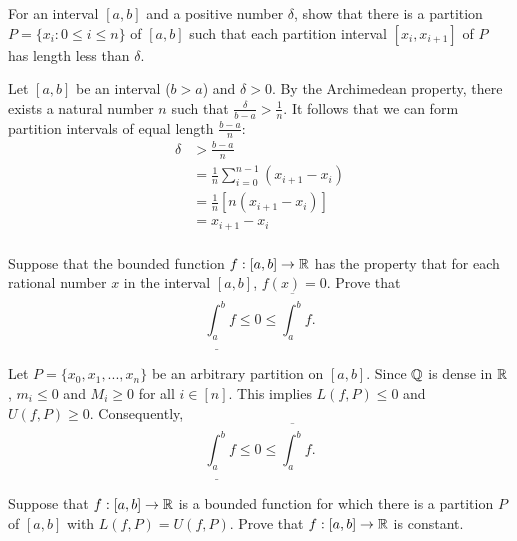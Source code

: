 \documentclass[letterpaper, twoside, 12pt]{book}
\begin{document}
\begin{exercise}[2]
  For an interval \([a,b]\) and a positive number \(\delta\),
  show that there is a partition \(P=\{x_i:0\leq i\leq n\}\) of
  \([a,b]\) such that each partition interval \([x_i,x_{i+1}]\)
  of \(P\) has length less than \(\delta\).
\end{exercise}

\begin{solution}
    Let \([a,b]\) be an interval (\(b > a\)) and \(\delta > 0\).
    By the Archimedean property, there exists a natural number
    \(n\) such that \(\frac{\delta}{b - a} > \frac{1}{n}\). It follows that
    we can form partition intervals of equal length \(\frac{b - a}{n}\):
    \begin{align*}
        \delta &> \frac{b - a}{n} \\
               &= \frac{1}{n} \sum_{i=0}^{n - 1} (x_{i + 1} - x_{i}) \\
               &= \frac{1}{n}[ n (x_{i + 1} - x_{i}) ] \\
               &= x_{i + 1} - x_{i} \\
    \end{align*}
\end{solution}


\begin{exercise}[3]
  Suppose that the bounded function \(f:[a,b]\to\mathbb R\) has the property
  that for each rational number \(x\) in the interval \([a,b]\),
  \(f(x)=0\). Prove that
  \[
    \underline{\int_a^b}f
      \leq
    0
      \leq
    \overline{\int_a^b}f
  .\]
\end{exercise}

\begin{solution}
    Let \(P = \{x_{0}, x_{1}, ... , x_{n}\}\) be an arbitrary partition on \([a,b]\).
    Since \(\mathbb Q\) is dense in \(\mathbb R\), \(m_{i} \leq 0\) and \(M_{i} \geq 0\) for
    all \(i \in [n]\). This implies \(L(f, P) \leq 0\) and \(U(f, P) \geq 0\). 
    Consequently, 
    \[ \underline{\int_a^b} f \leq 0 \leq \overline{\int_a^b} f .\]
\end{solution}


\begin{exercise}[6]
  Suppose that \(f:[a,b]\to\mathbb R\) is a bounded function for which there is
  a partition \(P\) of \([a,b]\) with \(L(f,P)=U(f,P)\). Prove that
  \(f:[a,b]\to\mathbb R\) is constant.
\end{exercise}
\end{document}
